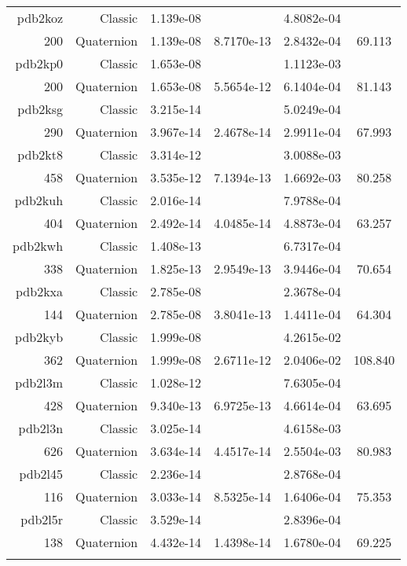 \begin{xltabular}{\textwidth}{r|rS[table-format=1.3e+2]S[table-format=1.4e+2]S[table-format=1.4e+2]S[table-format=-1.3]}
pdb2koz & Classic & 1.139e-08 &  & 4.8082e-04 & \\
200 & Quaternion & 1.139e-08 & 8.7170e-13 & 2.8432e-04 & 69.113\\  \addlinespace
pdb2kp0 & Classic & 1.653e-08 &  & 1.1123e-03 & \\
200 & Quaternion & 1.653e-08 & 5.5654e-12 & 6.1404e-04 & 81.143\\  \addlinespace
pdb2ksg & Classic & 3.215e-14 &  & 5.0249e-04 & \\
290 & Quaternion & 3.967e-14 & 2.4678e-14 & 2.9911e-04 & 67.993\\  \addlinespace
pdb2kt8 & Classic & 3.314e-12 &  & 3.0088e-03 & \\
458 & Quaternion & 3.535e-12 & 7.1394e-13 & 1.6692e-03 & 80.258\\  \addlinespace
pdb2kuh & Classic & 2.016e-14 &  & 7.9788e-04 & \\
404 & Quaternion & 2.492e-14 & 4.0485e-14 & 4.8873e-04 & 63.257\\  \addlinespace
pdb2kwh & Classic & 1.408e-13 &  & 6.7317e-04 & \\
338 & Quaternion & 1.825e-13 & 2.9549e-13 & 3.9446e-04 & 70.654\\  \addlinespace
pdb2kxa & Classic & 2.785e-08 &  & 2.3678e-04 & \\
144 & Quaternion & 2.785e-08 & 3.8041e-13 & 1.4411e-04 & 64.304\\  \addlinespace
pdb2kyb & Classic & 1.999e-08 &  & 4.2615e-02 & \\
362 & Quaternion & 1.999e-08 & 2.6711e-12 & 2.0406e-02 & 108.840\\  \addlinespace
pdb2l3m & Classic & 1.028e-12 &  & 7.6305e-04 & \\
428 & Quaternion & 9.340e-13 & 6.9725e-13 & 4.6614e-04 & 63.695\\  \addlinespace
pdb2l3n & Classic & 3.025e-14 &  & 4.6158e-03 & \\
626 & Quaternion & 3.634e-14 & 4.4517e-14 & 2.5504e-03 & 80.983\\  \addlinespace
pdb2l45 & Classic & 2.236e-14 &  & 2.8768e-04 & \\
116 & Quaternion & 3.033e-14 & 8.5325e-14 & 1.6406e-04 & 75.353\\  \addlinespace
pdb2l5r & Classic & 3.529e-14 &  & 2.8396e-04 & \\
138 & Quaternion & 4.432e-14 & 1.4398e-14 & 1.6780e-04 & 69.225\\  \addlinespace

\end{xltabular}
